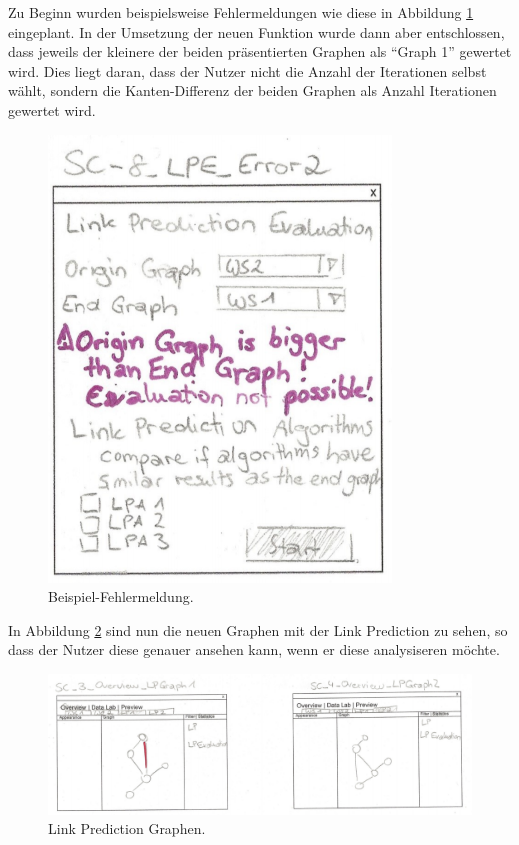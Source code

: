 Zu Beginn wurden beispielsweise Fehlermeldungen wie diese in Abbildung \ref{fig:screen11} eingeplant. In der Umsetzung
der neuen Funktion wurde dann aber entschlossen, dass jeweils der kleinere der beiden präsentierten Graphen als ``Graph 1''
gewertet wird. Dies liegt daran, dass der Nutzer nicht die Anzahl der Iterationen selbst wählt, sondern die
Kanten-Differenz der beiden Graphen als Anzahl Iterationen gewertet wird.

\begin{figure}
    \includegraphics[width=\linewidth]{resources/EV-5.png}
    \caption{Beispiel-Fehlermeldung.}
    \label{fig:screen11}
\end{figure}

In Abbildung \ref{fig:screen12}  sind nun die neuen Graphen mit der Link Prediction zu sehen, so dass der Nutzer diese genauer ansehen
kann, wenn er diese analysiseren möchte.

\begin{figure}
    \includegraphics[width=\linewidth]{resources/EV-2.png}
    \caption{Link Prediction Graphen.}
    \label{fig:screen12}
\end{figure}

